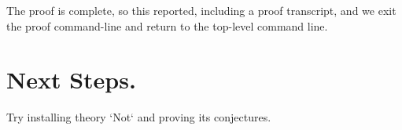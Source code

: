 \documentclass[11pt]{article}
\begin{document}
The proof is complete, so this reported, 
including a proof transcript, and we exit the proof command-line and return to the top-level command line.






\section{Next Steps.}

Try installing theory `Not` and proving its conjectures.
\end{document}
